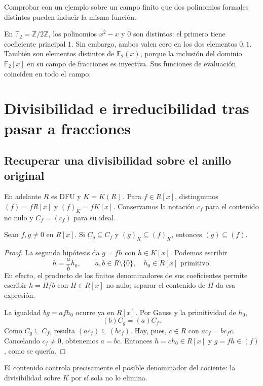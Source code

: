 \begin{ejer}\label{ejer:C18-formal-funcion}
Comprobar con un ejemplo sobre un campo finito que dos polinomios formales distintos pueden inducir la misma función.
\end{ejer}
\begin{sol}
En $\mathbb F_2=\mathbb Z/2\mathbb Z$, los polinomios $x^2-x$ y $0$ son distintos: el primero tiene coeficiente principal $1$. Sin embargo, ambos valen cero en los dos elementos $0,1$. También son elementos distintos de $\mathbb F_2(x)$, porque la inclusión del dominio $\mathbb F_2[x]$ en su campo de fracciones es inyectiva. Sus funciones de evaluación coinciden en todo el campo.
\end{sol}

\section{Divisibilidad e irreducibilidad tras pasar a fracciones}
\subsection{Recuperar una divisibilidad sobre el anillo original}
En adelante $R$ es DFU y $K=K(R)$. Para $f\in R[x]$, distinguimos $(f)=fR[x]$ y $(f)_K=fK[x]$. Conservamos la notación $c_f$ para el contenido no nulo y $C_f=(c_f)$ para su ideal.

\begin{lema}\label{lema:C18-descenso}
Sean $f,g\ne0$ en $R[x]$. Si $C_g\subseteq C_f$ y $(g)_K\subseteq(f)_K$, entonces $(g)\subseteq(f)$.
\end{lema}
\begin{proof}
La segunda hipótesis da $g=fh$ con $h\in K[x]$. Podemos escribir
\[
h=\frac ab h_0,\qquad a,b\in R\setminus\{0\},\quad h_0\in R[x]\text{ primitivo}.
\]
En efecto, el producto de los finitos denominadores de sus coeficientes permite escribir $h=H/b$ con $H\in R[x]$ no nulo; separar el contenido de $H$ da esa expresión.

La igualdad $bg=afh_0$ ocurre ya en $R[x]$. Por Gauss y la primitividad de $h_0$,
\[
(b)C_g=(a)C_f.
\]
Como $C_g\subseteq C_f$, resulta $(ac_f)\subseteq(bc_f)$. Hay, pues, $c\in R$ con $ac_f=bc_fc$. Cancelando $c_f\ne0$, obtenemos $a=bc$. Entonces $h=ch_0\in R[x]$ y $g=fh\in(f)$, como se quería.
\end{proof}
El contenido controla precisamente el posible denominador del cociente: la divisibilidad sobre $K$ por sí sola no lo elimina.

